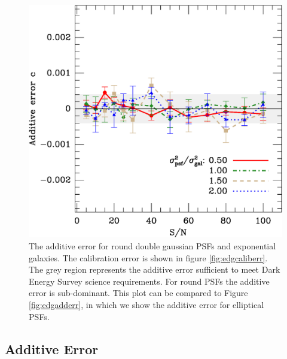 \documentclass[10pt,preprint]{aastex}
\newcommand{\psf}{PSF}
\begin{document}
\begin{figure}[t] \centering
 \centering 
 \includegraphics[scale=0.65]{figures/set-s2n-edg02-c-vs-shear.eps}

 \caption{The additive error for round double gaussian \psf s and exponential
 galaxies.  The calibration error is shown in figure \ref{fig:edgcaliberr}.
 The grey region represents the additive error sufficient to meet Dark Energy
 Survey science requirements.  For round \psf s the additive error is
 sub-dominant.  This plot can be compared to Figure \ref{fig:edgadderr},
 in which we show the additive error for elliptical \psf s.  } 

 \label{fig:edgverifyadditive}
\end{figure}


\subsection{Additive Error}
\end{document}
